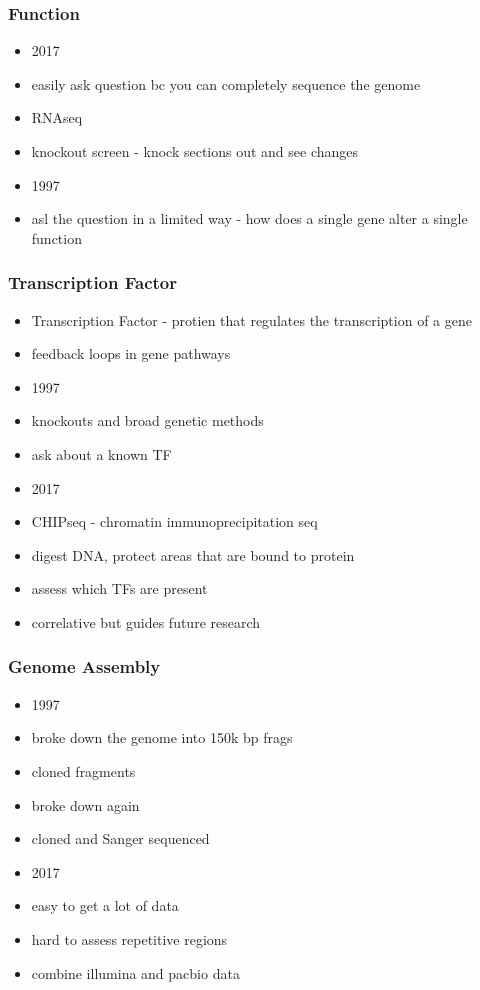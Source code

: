 \documentclass[14pt]{beamer}
\begin{document}
\begin{frame}
\frametitle{Function}
	\begin{itemize}
		\item 2017
		\item easily ask question bc you can completely sequence the genome
		\item RNAseq 
		\item knockout screen - knock sections out and see changes
		\item 1997
		\item asl the question in a limited way - how does a single gene alter a single function
	\end{itemize}
\end{frame}

\begin{frame}
\frametitle{Transcription Factor}
	\begin{itemize}
		\item Transcription Factor - protien that regulates the transcription of a gene
		\item feedback loops in gene pathways
		\item 1997
		\item knockouts and broad genetic methods
		\item ask about a known TF
		\item 2017
		\item CHIPseq - chromatin immunoprecipitation seq
		\item digest DNA, protect areas that are bound to protein
		\item assess which TFs are present
		\item correlative but guides future research
	\end{itemize}
\end{frame}

\begin{frame}
\frametitle{Genome Assembly}
	\begin{itemize}
		\item 1997
		\item broke down the genome into 150k bp frags
		\item cloned fragments
		\item broke down again
		\item cloned and Sanger sequenced
		\item 2017
		\item easy to get a lot of data
		\item hard to assess repetitive regions
		\item combine illumina and pacbio data
	\end{itemize}
\end{frame}
\end{document}
